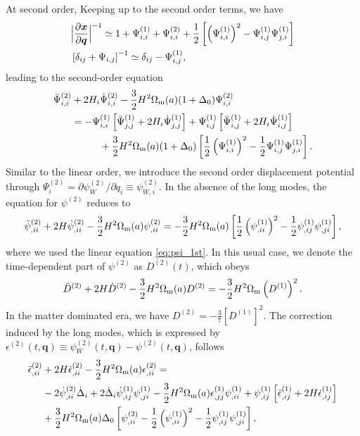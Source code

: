 \documentclass[a4paper,11pt]{article}
\newcommand{\vx}{{\bm x}}
\newcommand{\vq}{{\bm q}}
\begin{document}
At second order, Keeping up to the second order terms, we have
\begin{align}
&\Bigl| \frac{\partial\vx}{\partial\vq} \Bigr|^{-1}  \simeq
    1 + \Psi_{i,i}^{(1)} + \Psi_{i,i}^{(2)} + \frac12 \left[\left(\Psi_{i,i}^{(1)} \right)^2 - \Psi_{i,j}^{(1)}\Psi_{j,i}^{(1)} \right]
    \\
&\left[ \delta_{ij} + \Psi_{i,j} \right]^{-1} \simeq \delta_{ij} - \Psi_{i,j}^{(1)},
\end{align}
leading to the second-order equation
\begin{align}
\ddot \Psi^{(2)}_{i,i} &+ 2H_i\dot \Psi^{(2)}_{i,i} -\frac32 H^2\Omega_{\rm m}(a)(1+\Delta_0)\Psi_{i,i}^{(2)}
    \nonumber\\
    &= -\Psi_{i,i}^{(1)}\left[\ddot \Psi^{(1)}_{j,j} + 2H_i\dot \Psi_{j,j}^{(1)} \right]
    + \Psi_{i,j}^{(1)}\left[\ddot \Psi^{(1)}_{i,j} + 2H_i\dot \Psi_{i,j}^{(1)} \right]
    \nonumber\\
    &\hspace{1cm}+ \frac32 H^2 \Omega_{\rm m}(a) (1+\Delta_0) 
    \left[\frac12\left(\Psi_{i,i}^{(1)}\right)^2 - \frac12\Psi_{i,j}^{(1)}\Psi_{j,i}^{(1)}  \right].
\end{align}
Similar to the linear order, we introduce the second order displacement potential
through $\Psi_i^{(2)} = \partial\psi_W^{(2)}/\partial q_i \equiv \psi^{(2)}_{W,i}$.
In the absence of the long modes, the equation for $\psi^{(2)}$ reduces to
\begin{align}
\ddot \psi^{(2)}_{,ii} + 2H\dot \psi^{(2)}_{,ii}-\frac32 H^2 \Omega_{\rm m}(a)\psi^{(2)}_{,ii}
 = -\frac32 H^2 \Omega_{\rm m}(a)\left[\frac12 \left( \psi^{(1)}_{,ii} \right)^2 -\frac12 \psi^{(1)}_{,ij}\psi^{(1)}_{,ji} \right],
\end{align}
where we used the linear equation \eqref{eq:psi_1st}.
In this usual case, we denote the time-dependent part of $\psi^{(2)}$ as $D^{(2)}(t)$, which obeys
\begin{align}
\ddot D^{(2)} + 2H \dot D^{(2)} - \frac32 H^2 \Omega_{\rm m}(a) D^{(2)} = -\frac32 H^2 \Omega_{\rm m}\left( D^{(1)} \right)^2.
\end{align}
In the matter dominated era, we have $D^{(2)}= -\frac37 \left[D^{(1)}\right]^2$.
The correction induced by the long modes, which is expressed by $\epsilon^{(2)}(t, \vq)\equiv \psi_W^{(2)}(t, \vq) - \psi^{(2)}(t, \vq)$,
follows
\begin{align}
\ddot \epsilon^{(2)}_{,ii} &+ 2H \dot \epsilon^{(2)}_{,ii} - \frac32 H^2 \Omega_{\rm m}(a) \epsilon_{,ii}^{(2)}=
\nonumber\\
&-2\dot\psi^{(2)}_{,ii} \dot\Delta_i + 2\dot\Delta_i\dot\psi_{,ij}^{(1)}\psi_{,ji}^{(1)}
-\frac32 H^2 \Omega_{\rm m}(a) \epsilon^{(1)}_{,jj}\psi^{(1)}_{,ii} + \psi^{(1)}_{,ij} \left[ \ddot\epsilon_{,ij}^{(1)} + 2H\dot\epsilon_{,ij}^{(1)} \right]
\nonumber\\
&+\frac32 H^2 \Omega_{\rm m}(a)\Delta_0\left[ \psi_{,ii}^{(2)} - \frac12\left( \psi^{(1)}_{,ii}\right)^2- \frac12\psi^{(1)}_{,ij}\psi^{(1)}_{,ji} \right],
\label{eq:2nd_epsilon}
\end{align}
\end{document}
